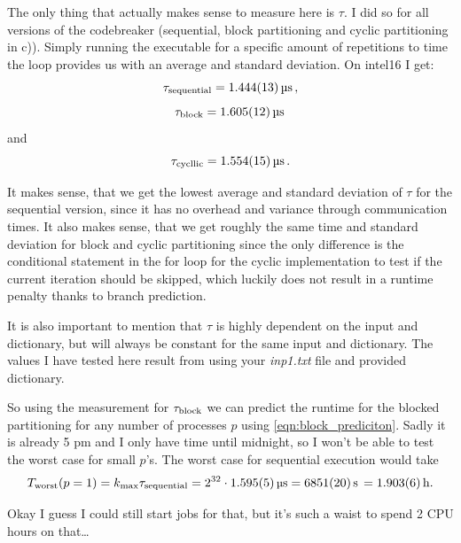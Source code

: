 \documentclass[a4paper, 11pt]{article}
\begin{document}
The only thing that actually makes sense to measure here is $\tau$. I did so
for all versions of the codebreaker (sequential, block partitioning and cyclic
partitioning in c)). Simply running the executable for a specific amount of
repetitions to time the loop provides us with an average and standard
deviation. On intel16 I get:
\begin{equation}
  \tau_\textup{sequential} = \SI{1.444 \pm 0.013}{\micro\second}\,,
  \label{eqn:tau_sequential}
\end{equation}
\begin{equation}
  \tau_\textup{block} = \SI{1.605 \pm 0.012}{\micro\second}\,
  \label{eqn:tau_block}
\end{equation}
and
\begin{equation}
  \tau_\textup{cycllic} =\SI{1.554 \pm 0.015}{\micro\second}\,.
  \label{eqn:tau_cyclic}
\end{equation}

It makes sense, that we get the lowest average and standard deviation of $\tau$
for the sequential version, since it has no overhead and variance through
communication times. It also makes sense, that we get roughly the same time and
standard deviation for block and cyclic partitioning since the only difference
is the conditional statement in the for loop for the cyclic implementation to
test if the current iteration should be skipped, which luckily does not result
in a runtime penalty thanks to branch prediction.

It is also important to mention that $\tau$ is highly dependent on the input
and dictionary, but will always be constant for the same input and dictionary.
The values I have tested here result from using your \textit{inp1.txt} file and
provided dictionary.

So using the measurement for $\tau_\textup{block}$ we can predict the runtime
for the blocked partitioning for any number of processes $p$ using
\eqref{eqn:block_prediciton}. Sadly it is already 5 pm and I only have time until midnight, so I won't be able to test the worst case for small $p$'s. The worst case for sequential execution would take
\begin{equation}
  \small
  T_\textup{worst}(p = 1) = k_\textup{max} \tau_\textup{sequential} = 2^{32}\cdot\SI{1.595 \pm 0.005}{\micro\second} = \SI{6851 \pm 20}{\second}\, = \SI{1.903 \pm 0.006}{\hour}.
\end{equation}

Okay I guess I could still start jobs for that, but it's such a waist to spend
2 CPU hours on that\dots
\end{document}
